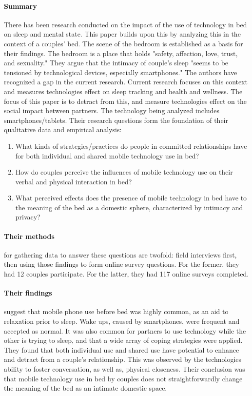\paragraph{Summary}
There has been research conducted on the impact of the use of technology in bed on sleep and mental state. This paper builds upon this by analyzing this in the context of a couples' bed. The scene of the bedroom is established as a basis for their findings. The bedroom is a place that holds "safety, affection, love, trust, and sexuality." They argue that the intimacy of couple's sleep "seems to be tensioned by technological devices, especially smartphones." The authors have recognized a gap in the current research. Current research focuses on this context and measures technologies effect on sleep tracking and health and wellness. The focus of this paper is to detract from this, and measure technologies effect on the social impact between partners. The technology being analyzed includes smartphones/tablets. Their research questions form the foundation of their qualitative data and empirical analysis:

\begin{enumerate}
\item
  What kinds of strategies/practices do people in committed relationships have for both individual and shared mobile technology use in bed?
\item
  How do couples perceive the influences of mobile technology use on their verbal and physical interaction in bed?
\item
  What perceived effects does the presence of mobile technology in bed have to the meaning of the bed as a domestic sphere, characterized by intimacy and privacy?
\end{enumerate}

\paragraph{Their methods} for gathering data to answer these questions are twofold: field interviews first, then using those findings to form online survey questions. For the former, they had 12 couples participate. For the latter, they had 117 online surveys completed.

\paragraph{Their findings} suggest that mobile phone use before bed was highly common, as an aid to relaxation prior to sleep. Wake ups, caused by smartphones, were frequent and accepted as normal. It was also common for partners to use technology while the other is trying to sleep, and that a wide array of coping strategies were applied. They found that both individual use and shared use have potential to enhance and detract from a couple's relationship. This was observed by the technologies ability to foster conversation, as well as, physical closeness. Their conclusion was that mobile technology use in bed by couples does not straightforwardly change the meaning of the bed as an intimate domestic space.


